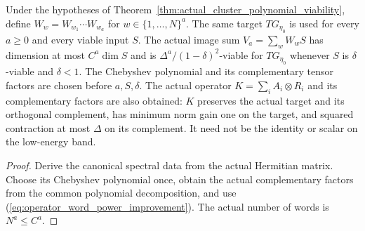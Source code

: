 \begin{lemma}
    \label{thm:actual_cluster_chebyshev_word_powers}
    \leanok
    Under the hypotheses of Theorem~\ref{thm:actual_cluster_polynomial_viability},
    define $W_w=W_{w_1}\cdots W_{w_a}$ for $w\in\{1,\ldots,N\}^a$.
    The same target $TG_{\eta_0}$ is used for every $a\ge0$ and every
    viable input $S$. The actual image sum $V_a=\sum_w W_wS$ has
    dimension at most $C^a\dim S$ and is
    $\Delta^a/(1-\delta)^2$-viable for $TG_{\eta_0}$ whenever $S$ is
    $\delta$-viable and $\delta<1$.
    The Chebyshev polynomial and its complementary tensor factors are
    chosen before $a,S,\delta$.
    The actual operator $K=\sum_i A_i\otimes R_i$ and its complementary
    factors are also obtained: $K$ preserves the actual target and its
    orthogonal complement, has minimum norm gain one on the target, and
    squared contraction at most $\Delta$ on its complement. It need not
    be the identity or scalar on the low-energy band.
\end{lemma}
\begin{proof}\leanok
    Derive the canonical spectral data from the actual Hermitian matrix.
    Choose its Chebyshev polynomial once, obtain the actual complementary
    factors from the common polynomial decomposition, and use
    (\ref{eq:operator_word_power_improvement}). The actual number of
    words is $N^a\le C^a$.
\end{proof}

